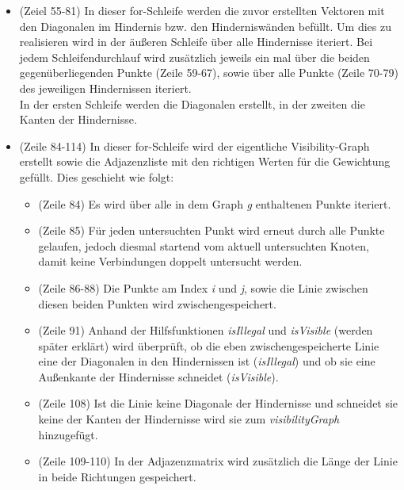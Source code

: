 \documentclass[a4paper]{scrartcl}
\begin{document}
\begin{itemize}
	\item (Zeiel 55-81) In dieser for-Schleife werden die zuvor erstellten Vektoren mit den Diagonalen im Hindernis bzw. den Hinderniswänden befüllt. Um dies zu realisieren wird in der äußeren Schleife über alle Hindernisse iteriert. Bei jedem Schleifendurchlauf wird zusätzlich jeweils ein mal über die beiden gegenüberliegenden Punkte (Zeile 59-67), sowie über alle Punkte (Zeile 70-79) des jeweiligen Hindernissen iteriert.\\
	In der ersten Schleife werden die Diagonalen erstellt, in der zweiten die Kanten der Hindernisse.
	\item (Zeile 84-114) In dieser for-Schleife wird der eigentliche Visibility-Graph erstellt sowie die Adjazenzliste mit den richtigen Werten für die Gewichtung gefüllt. Dies geschieht wie folgt:\\
	\begin{itemize}
		\item (Zeile 84) Es wird über alle in dem Graph \textit{g} enthaltenen Punkte iteriert.
		\item (Zeile 85) Für jeden untersuchten Punkt wird erneut durch alle Punkte gelaufen, jedoch diesmal startend vom aktuell untersuchten Knoten, damit keine Verbindungen doppelt untersucht werden.
		\item (Zeile 86-88) Die Punkte am Index \textit{i} und \textit{j}, sowie die Linie zwischen diesen beiden Punkten wird zwischengespeichert.
		\item (Zeile 91) Anhand der Hilfsfunktionen \textit{isIllegal} und \textit{isVisible} (werden später erklärt) wird überprüft, ob die eben zwischengespeicherte Linie eine der Diagonalen in den Hindernissen ist (\textit{isIllegal}) und ob sie eine Außenkante der Hindernisse schneidet (\textit{isVisible}).
		\item (Zeile 108) Ist die Linie keine Diagonale der Hindernisse und schneidet sie keine der Kanten der Hindernisse wird sie zum \textit{visibilityGraph} hinzugefügt.
		\item (Zeile 109-110) In der Adjazenzmatrix wird zusätzlich die Länge der Linie in beide Richtungen gespeichert.
		

\end{itemize}
\end{itemize}
\end{document}

